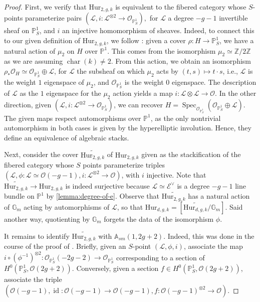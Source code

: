 \documentclass[12 pt]{amsart}
\theoremstyle{plain}
\theoremstyle{definition}
\theoremstyle{remark}
\numberwithin{equation}{section}
\newcommand\ba{\mathbb A}
\newcommand\bg{\mathbb G}
\newcommand\bp{\mathbb P}
\newcommand\bz{\mathbb Z}
\newcommand\sce{\mathscr E}
\newcommand\scl{\mathscr L}
\newcommand\sco{\mathscr O}
\newcommand \ra{\rightarrow}
\DeclareMathOperator\spec{\operatorname{Spec}}
\newcommand\hur[3]{\mathrm{Hur}_{#1,#2,#3}} %
\DeclareMathOperator\id{id}
\DeclareMathOperator\chr{\operatorname{char}}
\newcommand\sm{sm}
\begin{document}
\begin{proof} First, we verify that $\hur 2 g k$ is equivalent to the fibered category whose $S$-points
	parameterize pairs $(\scl, i: \scl^{\otimes 2} \ra \sco_{\bp^1_S}),$ for
	$\scl$ a degree $-g - 1$ invertible sheaf on $\bp^1_S$, and $i$ an
	injective homomorphism of sheaves. 	Indeed, to connect this to our
	given definition of $\hur 2 g k$, we follow \cite[Rem.\ 3.3 and Prop.\
	3.1]{arsieV:stacks-cyclic-covers}: given a cover $\rho: H \ra \bp^1_S$,
	we have a natural action of $\mu_2$ on $H$ over $\bp^1$. 
	This comes from the isomorphism $\mu_2 \simeq \bz/2\bz$ as we are
	assuming $\chr(k) \neq 2$.	
	From this action,
	we obtain an isomorphism $\rho_* \sco_H \simeq \sco_{\bp^1_S} \oplus
	\scl$, for $\scl$ the subsheaf on which $\mu_2$ acts by $(t,s) \mapsto
	t \cdot s$, i.e., $\scl$ is the weight $1$ eigenspace of $\mu_2$,
	and $\sco_{\bp^1_S}$ is the weight $0$ eigenspace.  The description of
	$\scl$ as the $1$ eigenspace for the $\mu_2$ action yields a map $i: \scl \otimes
	\scl \ra \sco$.  In the other direction, given $(\scl, i: \scl^{\otimes
	2} \ra \sco_{\bp^1_S})$, we can recover $H =
	\spec_{\sco_{\bp^1_S}}(\sco_{\bp^1_S} \oplus \scl).$
	The given maps respect automorphisms over $\bp^1$, as the only
	nontrivial automorphism in both cases is given by the hyperelliptic
	involution. Hence, they define an equivalence of algebraic stacks.

	Next, consider the cover $\widetilde{\hur 2 g k}$ of $\hur 2 g k$ given
	as the stackification of the fibered category whose
	$S$ points parameterize triples $(\scl, \phi: \scl \simeq \sco(-g-1), i:
	\scl^{\otimes 2} \ra \sco)$, with $i$ injective.  
	Note that $\widetilde{\hur 2 g k} \to \hur 2 g k$
	is indeed surjective because $\scl \simeq \sce^\vee$ is a degree $-g-1$
	line bundle on $\bp^1$ by \autoref{lemma:degree-of-e}.
	Observe that
	$\widetilde{\hur 2 g k}$ has a natural action of $\bg_m$ acting by
	automorphisms of $\scl$, so that $\hur d g k = [\widetilde{\hur d g
k}/\bg_m]$.  Said another way, quotienting by $\bg_m$ forgets the data of
	the isomorphism $\phi$.

It remains to identify $\widetilde{\hur 2 g k}$ with $\ba_{\sm}(1,2g+2)$.
Indeed, this was done in the course of the proof of \cite[Thm.\
4.1]{arsieV:stacks-cyclic-covers}.  Briefly, given an $S$-point $(\scl, \phi,
i)$, associate the map $i \circ (\phi^{-1})^{\otimes 2} :
\sco_{\bp^1_S}(-2g-2) \ra \sco_{\bp^1_S}$ corresponding to a section of
$H^0(\bp^1_S, \sco(2g+2))$.  Conversely, given a section $f \in H^0(\bp^1_S,
\sco(2g+2))$, associate the triple $(\sco(-g-1), \id: \sco(-g-1) \ra
	\sco(-g-1), f: \sco(-g-1)^{\otimes 2} \ra \sco)$.  \end{proof}
\end{document}
